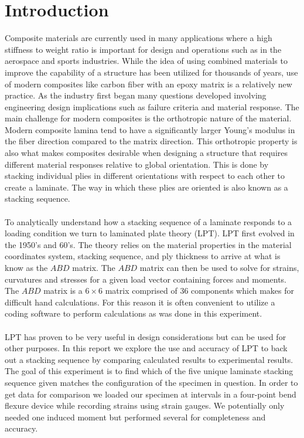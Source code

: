 \documentclass[12pt]{article}
\begin{document}
\section{Introduction} %
Composite materials are currently used in many applications where  a high stiffness to weight ratio is important for design and operations such as in the aerospace and sports industries.  While the idea of using combined materials to improve the capability of a structure has been utilized for thousands of years, use of modern composites like carbon fiber with an epoxy matrix is a relatively new practice.  As the industry first began many questions developed involving  engineering design implications such as failure criteria and material response. The main challenge for modern composites is the orthotropic nature of the material. Modern composite lamina tend to have a significantly larger Young's modulus in the fiber direction compared to the matrix direction.  This orthotropic property is also what makes composites desirable when designing a structure that requires different material responses relative to global orientation. This is done by stacking individual plies in different orientations with respect to each other to create a laminate. The way in which these plies are oriented is also known as a  stacking sequence.
\\ \\
To analytically understand how a stacking sequence of a laminate responds to a loading condition we turn to laminated plate theory (LPT).  LPT first evolved in the 1950's and 60's.\cite{Gibson} The theory relies on the material properties in the material coordinates system, stacking sequence, and ply thickness to arrive at what is know as the $ABD$ matrix. The $ABD$ matrix can then be used to solve for strains, curvatures and stresses for a given load vector containing forces and moments.  The $ABD$ matrix is  a $6\times6$ matrix  comprised of 36 components which makes for difficult hand calculations. For this reason it is often convenient to utilize a coding software to perform calculations as was done in this experiment. 
\\ \\
LPT has proven to be very useful in design considerations but can be used for other purposes.  In this report we explore the use  and accuracy of LPT to back out a stacking sequence by comparing calculated results to experimental results. The goal of this experiment is to find which of the five unique laminate stacking sequence given  matches the configuration of the specimen in question. In order to get data for comparison we loaded our specimen at intervals in a four-point bend flexure device while recording strains using strain gauges.  We potentially only needed one induced moment but performed several for completeness and accuracy. 
\end{document}
